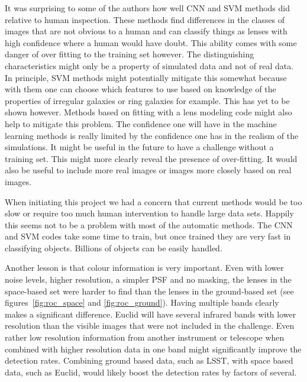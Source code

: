 \documentclass{aa}
\begin{document}
It was surprising to some of the authors how well CNN and SVM methods did relative to human inspection.  These methods find differences in the classes of images that are not obvious to a human and can classify things as lenses with high confidence where a human would have doubt. 
This ability comes with some danger of over fitting to the training set however.  The distinguishing characteristics might only be a property of simulated data and not of real data.  In principle, SVM methods might potentially mitigate this somewhat because with them one can choose which features to use based on knowledge of the properties of irregular galaxies or ring galaxies for example.  This has yet to be shown however.  Methods based on fitting with a lens modeling code \citep{2009ApJ...694..924M,2017arXiv170401585S} might also help to mitigate this problem.
The confidence one will have in the machine learning methods is really limited by the confidence one has in the realism of the simulations.   It might be useful in the future to have a challenge without a training set.  This might more clearly reveal the presence of over-fitting.  
It would also be useful to include more real images or images more closely based on real images.

When initiating this project we had a concern that current methods would be too slow or require too much human intervention to handle large data sets.  Happily this seems not to be a problem with most of the automatic methods.  The CNN and SVM codes take some time to train, but once trained they are very fast in classifying objects.  Billions of objects can be easily handled.

Another lesson is that colour information is very important.  Even with lower noise levels, higher resolution, a simpler PSF and no masking, the lenses in the space-based set were harder to find than the lenses in the ground-based set (see figures~\ref{fig:roc_space} and \ref{fig:roc_ground}).  Having multiple bands clearly makes a significant difference.  Euclid will have several infrared bands with lower resolution than the visible images that were not included in the challenge.  Even rather low resolution information from another instrument or telescope when combined with higher resolution data in one band might significantly improve the detection rates.  Combining ground based data, such as LSST, with space based data, such as Euclid, would likely boost the detection rates by factors of several.
\end{document}
